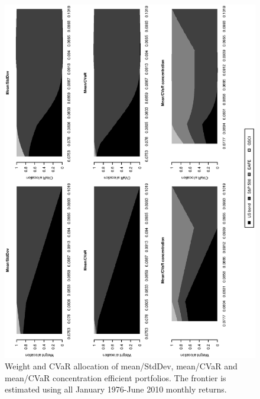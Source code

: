 \documentclass[11pt]{article}
\begin{document}
\begin{figure}[tb]
\begin{center}
\caption{Weight and CVaR allocation of mean/StdDev, mean/CVaR and mean/CVaR concentration efficient
portfolios. The frontier is  estimated using all January 1976-June 2010 monthly returns.  }
\includegraphics[width=12cm,angle=270]{stackedweightsriskcont_efficientfrontier.eps}
\end{center}
\end{figure}




\newpage
\end{document}

